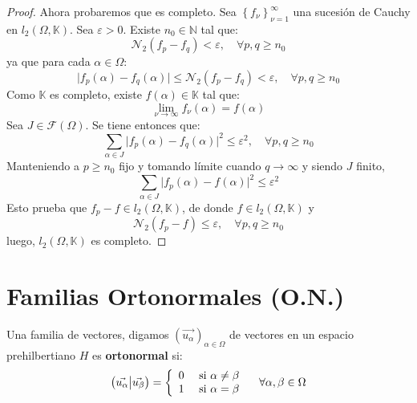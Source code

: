 \documentclass[12pt]{report}
\theoremstyle{largebreak}
\newcommand\abs[1]{\ensuremath{\big|#1\big|}}
\newcommand\pint[2]{\ensuremath{\left(#1\big| #2\right)}}
\begin{document}
\begin{proof}
        Ahora probaremos que es completo. Sea $\left\{f_\nu \right\}_{\nu=1}^\infty$ una sucesión de Cauchy en $l_2(\Omega,\mathbb{K})$. Sea $\varepsilon>0$. Existe $n_0\in\mathbb{N}$ tal que:
        \begin{equation*}
            \mathcal{N}_2(f_p-f_q)<\varepsilon,\quad\forall p,q\geq n_0
        \end{equation*}
        ya que para cada $\alpha\in\Omega$:
        \begin{equation*}
            \abs{f_p(\alpha)-f_q(\alpha)}\leq\mathcal{N}_2(f_p-f_q)<\varepsilon ,\quad\forall p,q\geq n_0
        \end{equation*}
        Como $\mathbb{K}$ es completo, existe $f(\alpha)\in\mathbb{K}$ tal que:
        \begin{equation*}
            \lim_{\nu\rightarrow\infty}f_\nu(\alpha)=f(\alpha)
        \end{equation*}
        Sea $J\in\mathcal{F}(\Omega)$. Se tiene entonces que:
        \begin{equation*}
            \sum_{\alpha\in J}\abs{f_p(\alpha)-f_q(\alpha)}^2\leq\varepsilon^2,\quad\forall p,q\geq n_0
        \end{equation*}
        Manteniendo a $p\geq n_0$ fijo y tomando límite cuando $q\rightarrow\infty$ y siendo $J$ finito,
        \begin{equation*}
            \sum_{\alpha\in J}\abs{f_p(\alpha)-f(\alpha)}^2\leq\varepsilon^2
        \end{equation*}
        Esto prueba que $f_p-f\in l_2(\Omega,\mathbb{K})$, de donde $f\in l_2(\Omega,\mathbb{K})$ y
        \begin{equation*}
            \mathcal{N}_2(f_p-f)\leq \varepsilon,\quad\forall p,q\geq n_0
        \end{equation*}
        luego, $l_2(\Omega,\mathbb{K})$ es completo.
    \end{proof}

    \section{Familias Ortonormales (O.N.)}

    \begin{mydef}
        Una familia de vectores, digamos $\left(\vec{u_\alpha} \right)_{\alpha\in\Omega}$ de vectores en un espacio prehilbertiano $H$ es \textbf{ortonormal} si:
        \begin{equation*}
                \pint{\vec{u_\alpha}}{\vec{u_\beta}}
                =\left\{\begin{array}{lcr}
                    0 & \textup{ si } \alpha\neq\beta\\
                    1 & \textup{ si } \alpha=\beta\\
                \end{array}
                \right.\quad\forall\alpha,\beta\in\Omega
        \end{equation*}
    \end{mydef}
    
\end{document}
